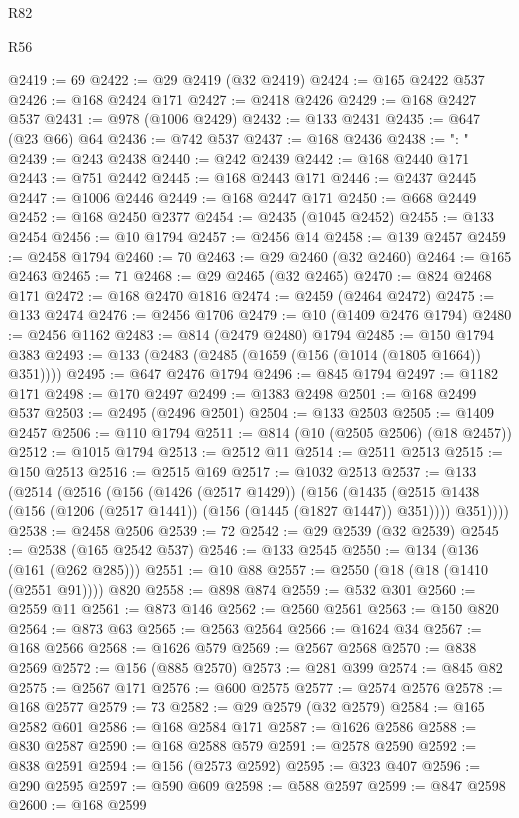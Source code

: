\begin{lexlean}{R82}
\begin{lexlean}{R56}
\begin{coremodule}
{{{{{{{{{{{{{{{{{{{{{{{{{{{{{{{{{{{{{{{{{{{{{{{{{{{{{{{{{{{{{{{{{{{{{{{{{{{{{{{{{{{{{{{{{{{{{{{{{{{{{{{{{{{{{{{{{{{{{{{{{{{{{{{{{{{{{{{{{{{{{{{{{{{{{{{{{{{{{{{{{{{{{{{{{{{{{{{{{{{{{{{{{{{{{{{{{{{{{{{{{{{{{{{{{{{@2419 := 69
@2422 := @29 @2419 (@32 @2419)
@2424 := @165 @2422 @537
@2426 := @168 @2424 @171
@2427 := @2418 @2426
@2429 := @168 @2427 @537
@2431 := @978 (@1006 @2429)
@2432 := @133 @2431
@2435 := @647 (@23 @66) @64
@2436 := @742 @537
@2437 := @168 @2436
@2438 := ": "
@2439 := @243 @2438
@2440 := @242 @2439
@2442 := @168 @2440 @171
@2443 := @751 @2442
@2445 := @168 @2443 @171
@2446 := @2437 @2445
@2447 := @1006 @2446
@2449 := @168 @2447 @171
@2450 := @668 @2449
@2452 := @168 @2450 @2377
@2454 := @2435 (@1045 @2452)
@2455 := @133 @2454
@2456 := @10 @1794
@2457 := @2456 @14
@2458 := @139 @2457
@2459 := @2458 @1794
@2460 := 70
@2463 := @29 @2460 (@32 @2460)
@2464 := @165 @2463
@2465 := 71
@2468 := @29 @2465 (@32 @2465)
@2470 := @824 @2468 @171
@2472 := @168 @2470 @1816
@2474 := @2459 (@2464 @2472)
@2475 := @133 @2474
@2476 := @2456 @1706
@2479 := @10 (@1409 @2476 @1794)
@2480 := @2456 @1162
@2483 := @814 (@2479 @2480) @1794
@2485 := @150 @1794 @383
@2493 := @133 (@2483 (@2485 (@1659 (@156 (@1014 (@1805 @1664)) @351))))
@2495 := @647 @2476 @1794
@2496 := @845 @1794
@2497 := @1182 @171
@2498 := @170 @2497
@2499 := @1383 @2498
@2501 := @168 @2499 @537
@2503 := @2495 (@2496 @2501)
@2504 := @133 @2503
@2505 := @1409 @2457
@2506 := @110 @1794
@2511 := @814 (@10 (@2505 @2506) (@18 @2457))
@2512 := @1015 @1794
@2513 := @2512 @11
@2514 := @2511 @2513
@2515 := @150 @2513
@2516 := @2515 @169
@2517 := @1032 @2513
@2537 := @133
    (@2514
      (@2516
        (@156
          (@1426 (@2517 @1429))
          (@156
            (@1435 (@2515 @1438 (@156 (@1206 (@2517 @1441)) (@156 (@1445 (@1827 @1447)) @351))))
            @351))))
@2538 := @2458 @2506
@2539 := 72
@2542 := @29 @2539 (@32 @2539)
@2545 := @2538 (@165 @2542 @537)
@2546 := @133 @2545
@2550 := @134 (@136 (@161 (@262 @285)))
@2551 := @10 @88
@2557 := @2550 (@18 (@18 (@1410 (@2551 @91)))) @820
@2558 := @898 @874
@2559 := @532 @301
@2560 := @2559 @11
@2561 := @873 @146
@2562 := @2560 @2561
@2563 := @150 @820
@2564 := @873 @63
@2565 := @2563 @2564
@2566 := @1624 @34
@2567 := @168 @2566
@2568 := @1626 @579
@2569 := @2567 @2568
@2570 := @838 @2569
@2572 := @156 (@885 @2570)
@2573 := @281 @399
@2574 := @845 @82
@2575 := @2567 @171
@2576 := @600 @2575
@2577 := @2574 @2576
@2578 := @168 @2577
@2579 := 73
@2582 := @29 @2579 (@32 @2579)
@2584 := @165 @2582 @601
@2586 := @168 @2584 @171
@2587 := @1626 @2586
@2588 := @830 @2587
@2590 := @168 @2588 @579
@2591 := @2578 @2590
@2592 := @838 @2591
@2594 := @156 (@2573 @2592)
@2595 := @323 @407
@2596 := @290 @2595
@2597 := @590 @609
@2598 := @588 @2597
@2599 := @847 @2598
@2600 := @168 @2599
}}}}}}}}}}}}}}}}}}}}}}}}}}}}}}}}}}}}}}}}}}}}}}}}}}}}}}}}}}}}}}}}}}}}}}}}}}}}}}}}}}}}}}}}}}}}}}}}}}}}}}}}}}}}}}}}}}}}}}}}}}}}}}}}}}}}}}}}}}}}}}}}}}}}}}}}}}}}}}}}}}}}}}}}}}}}}}}}}}}}}}}}}}}}}}}}}}}}}}}}}}}}}}}}}}}
\end{coremodule}
\end{lexlean}
\end{lexlean}
